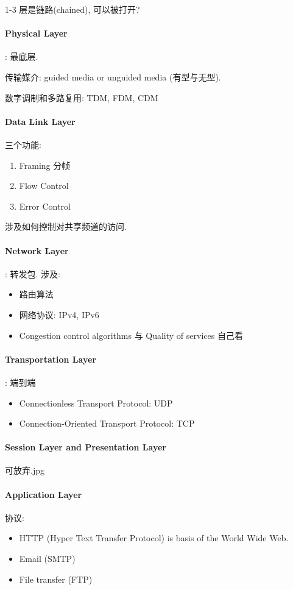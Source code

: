 1-3 层是链路(chained), 可以被打开? %

\paragraph{Physical Layer}: 最底层. 

传输媒介: guided media or unguided media (有型与无型). 

数字调制和多路复用: TDM, FDM, CDM

\paragraph{Data Link Layer}三个功能:
\begin{enumerate}
    \item Framing 分帧
    \item Flow Control
    \item Error Control
\end{enumerate}
涉及如何控制对共享频道的访问. 

\paragraph{Network Layer}: 转发包. 涉及:
\begin{itemize}
    \item 路由算法
    \item 网络协议: IPv4, IPv6
    \item Congestion control algorithms 与 Quality of services 自己看 %
\end{itemize}

\paragraph{Transportation Layer}: 端到端
\begin{itemize}
    \item Connectionless Transport Protocol: UDP
    \item Connection-Oriented Transport Protocol: TCP
\end{itemize}

\paragraph{Session Layer and Presentation Layer}可放弃.jpg

\paragraph{Application Layer}协议:
\begin{itemize}
    \item HTTP (Hyper Text Transfer Protocol) is basis of the World
    Wide Web.
    \item Email (SMTP)
    \item File transfer (FTP)
\end{itemize}

